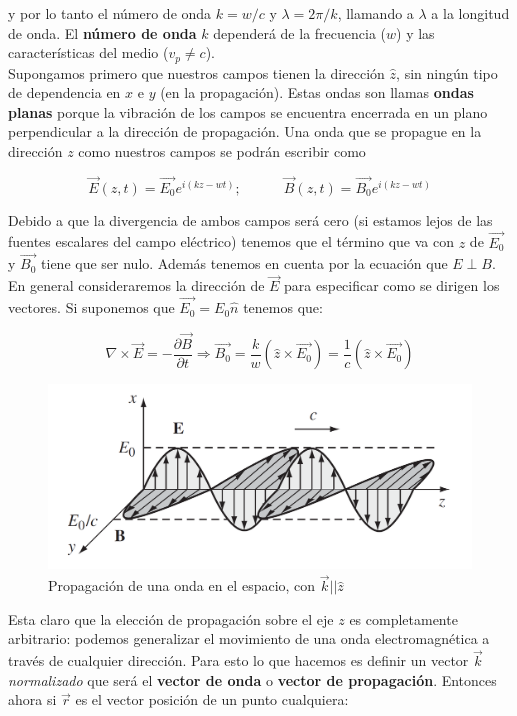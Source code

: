 \documentclass[12pt,a4paper]{article}
\newcommand{\tquad}{\quad \quad \quad}
\begin{document}
y por lo tanto el número de onda $k = w/c$ y $\lambda = 2 \pi/k$, llamando a $\lambda$ a la longitud de onda. El \textbf{número de onda} $k$ dependerá de la frecuencia ($w$) y las características del medio ($v_p \neq c$). \\


Supongamos primero que nuestros campos tienen la dirección $\widehat{z}$, sin ningún tipo de dependencia en $x$ e $y$ (en la propagación). Estas ondas son llamas \textbf{ondas planas} porque la vibración de los campos se encuentra encerrada en un plano perpendicular a la dirección de propagación. Una onda que se propague en la dirección $z$ como nuestros campos se podrán escribir como

\begin{equation}
\vec{E}(z,t) = \vec{E_0} e^{i(kz-wt)}; \tquad
\vec{B}(z,t) = \vec{B_0} e^{i(kz-wt)}
\end{equation}


Debido a que la divergencia de ambos campos será cero (si estamos lejos de las fuentes escalares del campo eléctrico) tenemos que el término que va con $z$ de $\vec{E_0}$ y $\vec{B_0}$ tiene que ser nulo. Además tenemos en cuenta por la ecuación que $E \perp B$. En general consideraremos la dirección de $\vec{E}$ para especificar como se dirigen los vectores. Si suponemos que $\vec{E_0} = E_0 \widehat{n}$ tenemos que:

$$
\nabla \times \vec{E} = - \dfrac{\partial \vec{B}}{\partial t} \Longrightarrow \vec{B_0} = \dfrac{k}{w} (\widehat{z} \times \vec{E_0}) = \dfrac{1}{c} (\widehat{z} \times \vec{E_0})
$$

\begin{figure}[h!] \centering
\includegraphics[scale=0.4]{ondaselectromagneticas.png}
\caption{Propagación de una onda en el espacio, con $\vec{k} || \widehat{z}$}
\end{figure}

Esta claro que la elección de propagación sobre el eje $z$ es completamente arbitrario: podemos generalizar el movimiento de una onda electromagnética a través de cualquier dirección. Para esto lo que hacemos es definir un vector $\vec{k}$ \textit{normalizado} que será el \textbf{vector de onda} o \textbf{vector de propagación}. Entonces ahora si $\vec{r}$ es el vector posición de un punto cualquiera:
\end{document}
